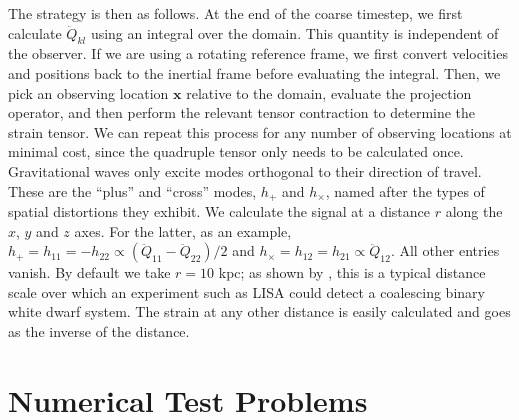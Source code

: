 \documentclass[iop,numberedappendix]{../emulateapj}
\begin{document}
The strategy is then as follows. At the end of the coarse timestep, we first calculate $\ddot{Q}_{kl}$
using an integral over the domain. This quantity is independent of the observer. If we 
are using a rotating reference frame, we first convert velocities and positions back to the inertial 
frame before evaluating the integral. Then, 
we pick an observing location $\mathbf{x}$ relative to the domain, evaluate the projection operator, 
and then perform the relevant tensor contraction to determine the strain tensor. We can 
repeat this process for any number of observing locations at minimal cost, since the quadruple tensor 
only needs to be calculated once. Gravitational waves only excite modes orthogonal to their 
direction of travel. These are the ``plus'' and ``cross'' modes, $h_+$ and $h_\times$, named after 
the types of spatial distortions they exhibit. We calculate the signal at a distance $r$ along 
the $x$, $y$ and $z$ axes. For the latter, as an example, $h_{+} = h_{11} = -h_{22} \propto (\ddot{Q}_{11} - \ddot{Q}_{22})/2$ and 
$h_{\times} = h_{12} = h_{21} \propto \ddot{Q}_{12}$. All other entries vanish. By default we take $r = 10$ kpc; 
as shown by \citet{loren-aguilar:2005}, this is a typical distance scale over which an 
experiment such as LISA could detect a coalescing binary white dwarf system. 
The strain at any other distance is easily calculated and goes as the inverse of the distance.



\section{Numerical Test Problems}\label{sec:Tests}
\end{document}
